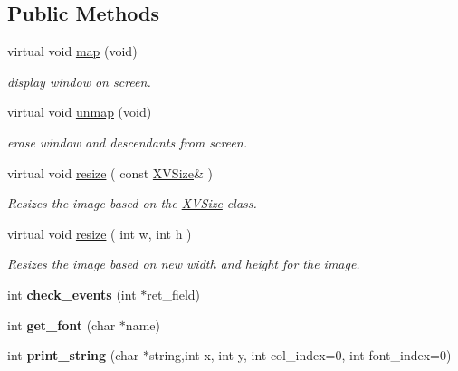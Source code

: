 \subsection*{Public Methods}
\begin{CompactItemize}
\item 
virtual void \hyperlink{class_XVWindowX_a0}{map} (void)
\begin{CompactList}\small\item\em display window on screen.\item\end{CompactList}\item 
virtual void \hyperlink{class_XVWindowX_a1}{unmap} (void)
\begin{CompactList}\small\item\em erase window and descendants from screen.\item\end{CompactList}\item 
virtual void \hyperlink{class_XVWindowX_a2}{resize} ( const \hyperlink{class_XVSize}{XVSize}\& )
\begin{CompactList}\small\item\em Resizes the image based on the \hyperlink{class_XVSize}{XVSize} class.\item\end{CompactList}\item 
virtual void \hyperlink{class_XVWindowX_a3}{resize} ( int w, int h )
\begin{CompactList}\small\item\em Resizes the image based on new width and height for the image.\item\end{CompactList}\item 
\label{XVWindowX_a4}
\hypertarget{class_XVWindowX_a4}{
int {\bf check\_\-events} (int $\ast$ret\_\-field)}

\item 
\label{XVWindowX_a5}
\hypertarget{class_XVWindowX_a5}{
int {\bf get\_\-font} (char $\ast$name)}

\item 
\label{XVWindowX_a6}
\hypertarget{class_XVWindowX_a6}{
int {\bf print\_\-string} (char $\ast$string,int x, int y, int col\_\-index=0, int font\_\-index=0)}


\end{CompactItemize}
